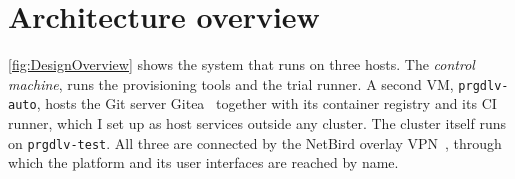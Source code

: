 \section{Architecture overview}
\label{sec:DesignOverview}
\autoref{fig:DesignOverview} shows the system that runs on three hosts. The \emph{control machine}, runs the provisioning tools and the trial runner. A second VM, \texttt{prgdlv-auto}, hosts the Git server Gitea~\cite{Gitea} together with its container registry and its CI runner, which I set up as host services outside any cluster. The cluster itself runs on \texttt{prgdlv-test}. All three are connected by the NetBird overlay VPN~\cite{NetBird}, through which the platform and its user interfaces are reached by name.

